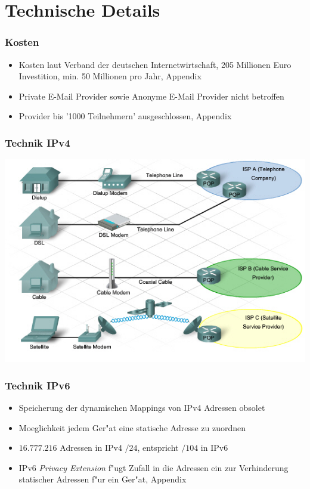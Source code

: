 
\section{Technische Details}
    \begin{frame}
      \frametitle{Kosten}
      \begin{itemize}
        \item 
          Kosten laut Verband der deutschen Internetwirtschaft, 205 Millionen Euro Investition, min. 50 Millionen pro Jahr, Appendix \cite{kostenVDS}
        \item
          Private E-Mail Provider sowie Anonyme E-Mail Provider nicht betroffen
        \item 
          Provider bis '1000  Teilnehmern' ausgeschlossen, Appendix \cite{emailAusnahme}
      \end{itemize}
    \end{frame}

  \begin{frame}
    \frametitle{Technik IPv4}
    \includegraphics[scale=0.65 ]{sections/img/internet_ipv4.jpg}
  \end{frame}

  \begin{frame}
    \frametitle{Technik IPv6}
    \begin{itemize}
      \item Speicherung der dynamischen Mappings von IPv4 Adressen obsolet
      \item Moeglichkeit jedem Ger"at eine statische Adresse zu zuordnen
      \item \( 16.777.216 \) Adressen in IPv4 \( /24 \), entspricht \( /104 \) in IPv6
      \item IPv6 {\em Privacy Extension} f"ugt Zufall in die Adressen ein zur Verhinderung statischer Adressen f"ur ein Ger"at, Appendix \cite{RFC4941}
    \end{itemize}
  \end{frame}